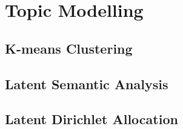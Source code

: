 \chapter{Topic Modelling}
\label{cha:topic_modelling}

\section{K-means Clustering}
\label{sec:kmeans}

\section{Latent Semantic Analysis}
\label{sec:lsa}

\section{Latent Dirichlet Allocation}
\label{sec:lda}


